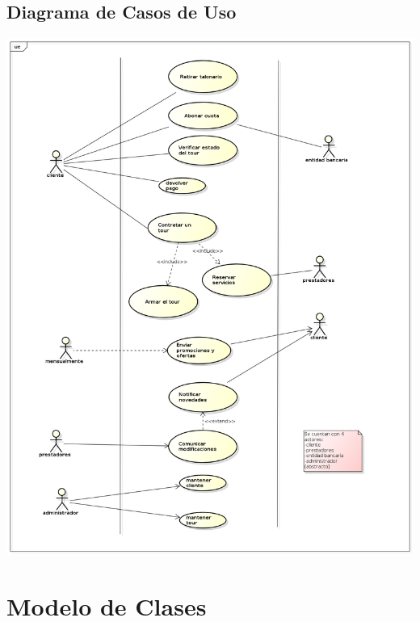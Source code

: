 \documentclass[12pt,a4paper]{article}
\begin{document}
\subsection{Diagrama de Casos de Uso}
	\includegraphics[scale=0.5]{images/UseCaseDiagram3.png}

\section{Modelo de Clases}
\end{document}
